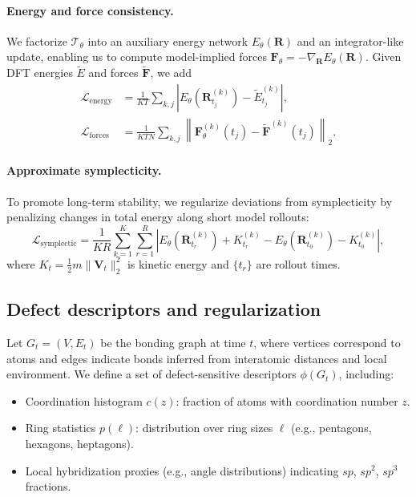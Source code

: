 \documentclass{article}
\begin{document}
\paragraph{Energy and force consistency.}
We factorize $\mathcal{T}_\theta$ into an auxiliary energy network $E_\theta(\mathbf{R})$ and an integrator-like update, enabling us to compute model-implied forces $\mathbf{F}_\theta = -\nabla_{\mathbf{R}} E_\theta(\mathbf{R})$. Given DFT energies $\tilde{E}$ and forces $\tilde{\mathbf{F}}$, we add
\begin{align}
    \mathcal{L}_\text{energy} &= \frac{1}{K T} \sum_{k,j} \left| E_\theta(\mathbf{R}^{(k)}_{t_j}) - \tilde{E}^{(k)}_{t_j} \right|, \\
    \mathcal{L}_\text{forces} &= \frac{1}{K T N} \sum_{k,j} \left\| \mathbf{F}_\theta^{(k)}(t_j) - \tilde{\mathbf{F}}^{(k)}(t_j) \right\|_2.
\end{align}

\paragraph{Approximate symplecticity.}
To promote long-term stability, we regularize deviations from symplecticity by penalizing changes in total energy along short model rollouts:
\begin{equation}
    \mathcal{L}_\text{symplectic} = \frac{1}{K R} \sum_{k=1}^K \sum_{r=1}^R \left| E_\theta(\mathbf{R}^{(k)}_{t_r}) + K^{(k)}_{t_r} - E_\theta(\mathbf{R}^{(k)}_{t_0}) - K^{(k)}_{t_0} \right|,
\end{equation}
where $K_t = \frac{1}{2} m \|\mathbf{V}_t\|_2^2$ is kinetic energy and $\{t_r\}$ are rollout times.

\subsection{Defect descriptors and regularization}

Let $G_t = (V, E_t)$ be the bonding graph at time $t$, where vertices correspond to atoms and edges indicate bonds inferred from interatomic distances and local environment. We define a set of defect-sensitive descriptors $\phi(G_t)$, including:
\begin{itemize}
    \item Coordination histogram $c(z)$: fraction of atoms with coordination number $z$.
    \item Ring statistics $p(\ell)$: distribution over ring sizes $\ell$ (e.g., pentagons, hexagons, heptagons).
    \item Local hybridization proxies (e.g., angle distributions) indicating $sp$, $sp^2$, $sp^3$ fractions.
\end{itemize}
\end{document}
